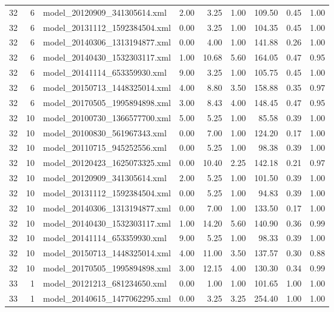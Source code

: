 \begin{table}[ht]
\begin{tabular}{rrlrrrrrr}
   32 &   6 & model\_20120909\_341305614.xml & 2.00 & 3.25 & 1.00 & 109.50 & 0.45 & 1.00 \\ 
   32 &   6 & model\_20131112\_1592384504.xml & 0.00 & 3.25 & 1.00 & 104.35 & 0.45 & 1.00 \\ 
   32 &   6 & model\_20140306\_1313194877.xml & 0.00 & 4.00 & 1.00 & 141.88 & 0.26 & 1.00 \\ 
   32 &   6 & model\_20140430\_1532303117.xml & 1.00 & 10.68 & 5.60 & 164.05 & 0.47 & 0.95 \\ 
   32 &   6 & model\_20141114\_653359930.xml & 9.00 & 3.25 & 1.00 & 105.75 & 0.45 & 1.00 \\ 
   32 &   6 & model\_20150713\_1448325014.xml & 4.00 & 8.80 & 3.50 & 158.88 & 0.35 & 0.97 \\ 
   32 &   6 & model\_20170505\_1995894898.xml & 3.00 & 8.43 & 4.00 & 148.45 & 0.47 & 0.95 \\ 
   32 &  10 & model\_20100730\_1366577700.xml & 5.00 & 5.25 & 1.00 & 85.58 & 0.39 & 1.00 \\ 
   32 &  10 & model\_20100830\_561967343.xml & 0.00 & 7.00 & 1.00 & 124.20 & 0.17 & 1.00 \\ 
   32 &  10 & model\_20110715\_945252556.xml & 0.00 & 5.25 & 1.00 & 98.38 & 0.39 & 1.00 \\ 
   32 &  10 & model\_20120423\_1625073325.xml & 0.00 & 10.40 & 2.25 & 142.18 & 0.21 & 0.97 \\ 
   32 &  10 & model\_20120909\_341305614.xml & 2.00 & 5.25 & 1.00 & 101.50 & 0.39 & 1.00 \\ 
   32 &  10 & model\_20131112\_1592384504.xml & 0.00 & 5.25 & 1.00 & 94.83 & 0.39 & 1.00 \\ 
   32 &  10 & model\_20140306\_1313194877.xml & 0.00 & 7.00 & 1.00 & 133.50 & 0.17 & 1.00 \\ 
   32 &  10 & model\_20140430\_1532303117.xml & 1.00 & 14.20 & 5.60 & 140.90 & 0.36 & 0.99 \\ 
   32 &  10 & model\_20141114\_653359930.xml & 9.00 & 5.25 & 1.00 & 98.33 & 0.39 & 1.00 \\ 
   32 &  10 & model\_20150713\_1448325014.xml & 4.00 & 11.00 & 3.50 & 137.57 & 0.30 & 0.88 \\ 
   32 &  10 & model\_20170505\_1995894898.xml & 3.00 & 12.15 & 4.00 & 130.30 & 0.34 & 0.99 \\ 
   33 &   1 & model\_20121213\_681234650.xml & 0.00 & 1.00 & 1.00 & 101.65 & 1.00 & 1.00 \\ 
   33 &   1 & model\_20140615\_1477062295.xml & 0.00 & 3.25 & 3.25 & 254.40 & 1.00 & 1.00 \\ 

\end{tabular}
\end{table}
